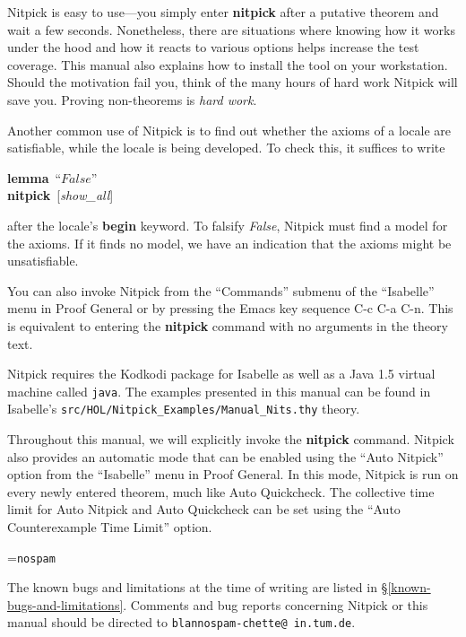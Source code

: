 \documentclass[a4paper,12pt]{article}
\begin{document}
Nitpick is easy to use---you simply enter \textbf{nitpick} after a putative
theorem and wait a few seconds. Nonetheless, there are situations where knowing
how it works under the hood and how it reacts to various options helps
increase the test coverage. This manual also explains how to install the tool on
your workstation. Should the motivation fail you, think of the many hours of
hard work Nitpick will save you. Proving non-theorems is \textsl{hard work}.

Another common use of Nitpick is to find out whether the axioms of a locale are
satisfiable, while the locale is being developed. To check this, it suffices to
write

\prew
\textbf{lemma}~``$\textit{False}$'' \\
\textbf{nitpick}~[\textit{show\_all}]
\postw

after the locale's \textbf{begin} keyword. To falsify \textit{False}, Nitpick
must find a model for the axioms. If it finds no model, we have an indication
that the axioms might be unsatisfiable.

You can also invoke Nitpick from the ``Commands'' submenu of the
``Isabelle'' menu in Proof General or by pressing the Emacs key sequence C-c C-a
C-n. This is equivalent to entering the \textbf{nitpick} command with no
arguments in the theory text.

Nitpick requires the Kodkodi package for Isabelle as well as a Java 1.5 virtual
machine called \texttt{java}. The examples presented in this manual can be found
in Isabelle's \texttt{src/HOL/Nitpick\_Examples/Manual\_Nits.thy} theory.

Throughout this manual, we will explicitly invoke the \textbf{nitpick} command.
Nitpick also provides an automatic mode that can be enabled using the
``Auto Nitpick'' option from the ``Isabelle'' menu in Proof General. In this
mode, Nitpick is run on every newly entered theorem, much like Auto Quickcheck.
The collective time limit for Auto Nitpick and Auto Quickcheck can be set using
the ``Auto Counterexample Time Limit'' option.

\newbox\boxA
\setbox\boxA=\hbox{\texttt{nospam}}

The known bugs and limitations at the time of writing are listed in
\S\ref{known-bugs-and-limitations}. Comments and bug reports concerning Nitpick
or this manual should be directed to
\texttt{blan{\color{white}nospam}\kern-\wd\boxA{}chette@\allowbreak
in.\allowbreak tum.\allowbreak de}.

\smallskipamount
\end{document}
